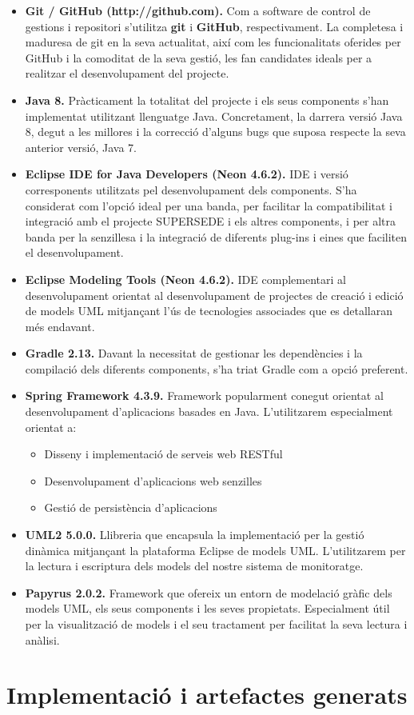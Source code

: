 \begin{itemize}
\item \textbf{Git / GitHub (http://github.com).} Com a software de control de gestions i repositori s'utilitza \textbf{git} i \textbf{GitHub}, respectivament. La completesa i maduresa de git en la seva actualitat, així com les funcionalitats oferides per GitHub i la comoditat de la seva gestió, les fan candidates ideals per a realitzar el desenvolupament del projecte.
\item \textbf{Java 8.} Pràcticament la totalitat del projecte i els seus components s'han implementat utilitzant llenguatge Java. Concretament, la darrera versió Java 8, degut a les millores i la correcció d'alguns bugs que suposa respecte la seva anterior versió, Java 7.
\item \textbf{Eclipse IDE for Java Developers (Neon 4.6.2).} IDE i versió corresponents utilitzats pel desenvolupament dels components. S'ha considerat com l'opció ideal per una banda, per facilitar la compatibilitat i integració amb el projecte SUPERSEDE i els altres components, i per altra banda per la senzillesa i la integració de diferents plug-ins i eines que faciliten el desenvolupament. 
\item \textbf{Eclipse Modeling Tools (Neon 4.6.2).}  IDE complementari al desenvolupament orientat al desenvolupament de projectes de creació i edició de models UML mitjançant l'ús de tecnologies associades que es detallaran més endavant. 
\item \textbf{Gradle 2.13.} Davant la necessitat de gestionar les dependències i la compilació dels diferents components, s'ha triat Gradle com a opció preferent.
\item \textbf{Spring Framework 4.3.9.} Framework popularment conegut orientat al desenvolupament d'aplicacions basades en Java. L'utilitzarem especialment orientat a:
\begin{itemize}
\item Disseny i implementació de serveis web RESTful
\item Desenvolupament d'aplicacions web senzilles
\item Gestió de persistència d'aplicacions
\end{itemize}
\item \textbf{UML2 5.0.0.} Llibreria que encapsula la implementació per la gestió dinàmica mitjançant la plataforma Eclipse de models UML. L'utilitzarem per la lectura i escriptura dels models del nostre sistema de monitoratge.
\item \textbf{Papyrus 2.0.2.} Framework que ofereix un entorn de modelació gràfic dels models UML, els seus components i les seves propietats. Especialment útil per la visualització de models i el seu tractament per facilitat la seva lectura i anàlisi.
\end{itemize}

\section{Implementació i artefactes generats}